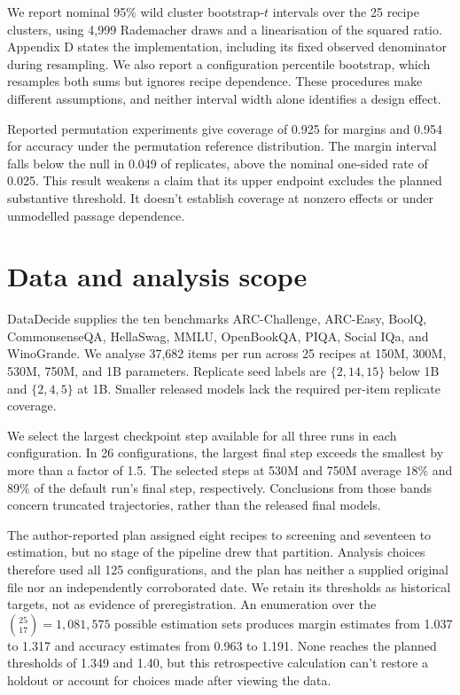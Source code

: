 \documentclass{article}
\begin{document}
We report nominal 95\% wild cluster bootstrap-$t$ intervals over the 25 recipe clusters, using 4,999 Rademacher draws and a linearisation of the squared ratio. Appendix D states the implementation, including its fixed observed denominator during resampling. We also report a configuration percentile bootstrap, which resamples both sums but ignores recipe dependence. These procedures make different assumptions, and neither interval width alone identifies a design effect.

Reported permutation experiments give coverage of 0.925 for margins and 0.954 for accuracy under the permutation reference distribution. The margin interval falls below the null in 0.049 of replicates, above the nominal one-sided rate of 0.025. This result weakens a claim that its upper endpoint excludes the planned substantive threshold. It doesn't establish coverage at nonzero effects or under unmodelled passage dependence.

\section{Data and analysis scope}
DataDecide supplies the ten benchmarks ARC-Challenge, ARC-Easy, BoolQ, CommonsenseQA, HellaSwag, MMLU, OpenBookQA, PIQA, Social IQa, and WinoGrande. We analyse 37,682 items per run across 25 recipes at 150M, 300M, 530M, 750M, and 1B parameters. Replicate seed labels are $\{2,14,15\}$ below 1B and $\{2,4,5\}$ at 1B. Smaller released models lack the required per-item replicate coverage.

We select the largest checkpoint step available for all three runs in each configuration. In 26 configurations, the largest final step exceeds the smallest by more than a factor of 1.5. The selected steps at 530M and 750M average 18\% and 89\% of the default run's final step, respectively. Conclusions from those bands concern truncated trajectories, rather than the released final models.

The author-reported plan assigned eight recipes to screening and seventeen to estimation, but no stage of the pipeline drew that partition. Analysis choices therefore used all 125 configurations, and the plan has neither a supplied original file nor an independently corroborated date. We retain its thresholds as historical targets, not as evidence of preregistration. An enumeration over the $\binom{25}{17}=1{,}081{,}575$ possible estimation sets produces margin estimates from 1.037 to 1.317 and accuracy estimates from 0.963 to 1.191. None reaches the planned thresholds of 1.349 and 1.40, but this retrospective calculation can't restore a holdout or account for choices made after viewing the data.
\end{document}
